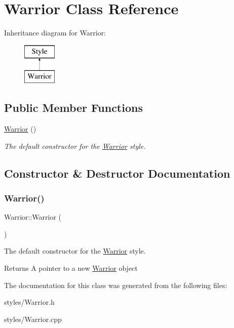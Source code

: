 \hypertarget{class_warrior}{}\section{Warrior Class Reference}
\label{class_warrior}
Inheritance diagram for Warrior\+:\begin{figure}[H]
\begin{center}
\leavevmode
\includegraphics[height=2.000000cm]{class_warrior}
\end{center}
\end{figure}
\subsection*{Public Member Functions}
\begin{DoxyCompactItemize}
\item 
\mbox{\hyperlink{class_warrior_a514c253a8e9c3f845f11f344804335d4}{Warrior}} ()
\begin{DoxyCompactList}\small\item\em The default constructor for the \mbox{\hyperlink{class_warrior}{Warrior}} style. \end{DoxyCompactList}\end{DoxyCompactItemize}


\subsection{Constructor \& Destructor Documentation}
\mbox{\label{class_warrior_a514c253a8e9c3f845f11f344804335d4}} 
\subsubsection{\texorpdfstring{Warrior()}{Warrior()}}
{\footnotesize\ttfamily Warrior\+::\+Warrior (\begin{DoxyParamCaption}{ }\end{DoxyParamCaption})}



The default constructor for the \mbox{\hyperlink{class_warrior}{Warrior}} style. 

\begin{DoxyReturn}{Returns}
A pointer to a new \mbox{\hyperlink{class_warrior}{Warrior}} object 
\end{DoxyReturn}


The documentation for this class was generated from the following files\+:\begin{DoxyCompactItemize}
\item 
styles/Warrior.\+h\item 
styles/Warrior.\+cpp\end{DoxyCompactItemize}
